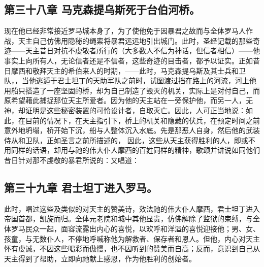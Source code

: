 
\subsection{第三十八章 马克森提乌斯死于台伯河桥。}

现在他已经非常接近罗马城本身了，为了使他免于因暴君之故而与全体罗马人作战，天主自己仿佛用隐秘的绳索将暴君远远地引出城门。此时，圣经记载的那些奇迹——天主昔日对抗不虔敬者所行的（大多数人不信为神话，但信者相信）——他事实上向所有人，无论信者还是不信者，这些奇迹的目击者，都予以证实。正如昔日摩西和敬拜天主的希伯来人的时期，——此时，马克森提乌斯及其士兵和卫队，，当他逃遁于君士坦丁的天助军队之前时，试图渡过挡在路上的河流，河上他用船只搭造了一座坚固的桥，却为自己制造了毁灭的机关，实际上是对付自己，而原希望藉此捕捉那位天主所爱者。因为他的天主站在一旁保护他，而另一人，无神，却证明是这些秘密装置的可怜设计者，自取灭亡。因此，人可正当地说：如此，在目前的情况下，在天主指引下，桥上的机关和隐藏的伏兵，在预定时间之前意外地坍塌，桥开始下沉，船与人整体沉入水底。先是那恶人自身，然后他的武装侍从和卫队，正如圣言之前所描述的， 因此，这些从天主获得胜利的人，即或不用同样的话语，却用与祂的伟大仆人摩西的百姓同样的精神，歌颂并讲说如同他们昔日针对那不虔敬的暴君所说的：又唱道：\par


\subsection{第三十九章 君士坦丁进入罗马。}

此时，唱过这些及类似的对天主的赞美诗，效法祂的伟大仆人摩西，君士坦丁进入帝国首都，凯旋而归。全体元老院和城中其他显贵，仿佛解除了监狱的束缚，与全体罗马民众一起，面容流露出内心的喜悦，以欢呼和洋溢的喜悦迎接他；男、女、孩童，与无数仆人，不停地呼喊称他为解救者、保存者和恩人。但他，内心对天主怀有虔诚，不因这些喝彩而傲慢，也不因听到的赞美而自高；反而，意识到自己从天主得到了帮助，立即向祂献上感恩，作为他胜利的创始者。\par


